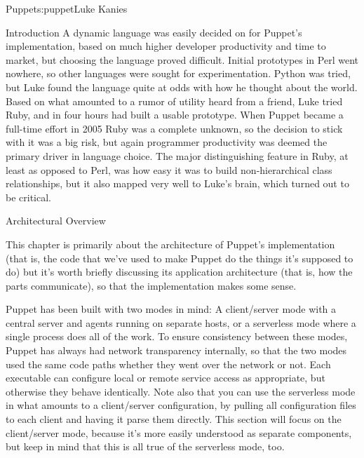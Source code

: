 \begin{aosachapter}{Puppet}{s:puppet}{Luke Kanies}
\begin{aosasect1}{Introduction}
A dynamic language was easily decided on for Puppet's implementation,
based on much higher developer productivity and time to market, but
choosing the language proved difficult.  Initial prototypes in Perl
went nowhere, so other languages were sought for experimentation.
Python was tried, but Luke found the language quite at odds with how
he thought about the world.  Based on what amounted to a rumor of
utility heard from a friend, Luke tried Ruby, and in four hours had
built a usable prototype.  When Puppet became a full-time effort in
2005 Ruby was a complete unknown, so the decision to stick with it
was a big risk, but again programmer productivity was deemed the
primary driver in language choice.  The major distinguishing feature
in Ruby, at least as opposed to Perl, was how easy it was to build
non-hierarchical class relationships, but it also mapped very well to
Luke's brain, which turned out to be critical.

\end{aosasect1}

\begin{aosasect1}{Architectural Overview}

This chapter is primarily about the architecture of Puppet's
implementation (that is, the code that we've used to make Puppet do
the things it's supposed to do) but it's worth briefly discussing its
application architecture (that is, how the parts communicate), so that
the implementation makes some sense.

Puppet has been built with two modes in mind: A client/server mode
with a central server and agents running on separate hosts, or a
serverless mode where a single process does all of the work.  To
ensure consistency between these modes, Puppet has always had network
transparency internally, so that the two modes used the same code
paths whether they went over the network or not.  Each executable can
configure local or remote service access as appropriate, but otherwise
they behave identically.  Note also that you can use the serverless
mode in what amounts to a client/server configuration, by pulling all
configuration files to each client and having it parse them directly.
This section will focus on the client/server mode, because it's more
easily understood as separate components, but keep in mind that this
is all true of the serverless mode, too.


\end{aosasect1}
\end{aosachapter}
